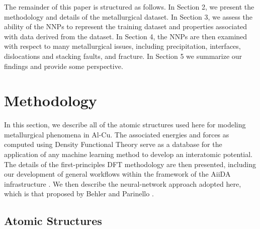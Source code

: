 \documentclass{article}
\begin{document}
The remainder of this paper is structured as follows.  In Section 2, we present the methodology and details of the metallurgical dataset.  In Section 3, we assess the ability of the NNPs to represent the training dataset and properties associated with data derived from the dataset.  In Section 4, the NNPs are then examined with respect to many metallurgical issues, including precipitation, interfaces, dislocations and stacking faults, and fracture. In Section 5 we summarize our findings and provide some perspective.

\section{Methodology}

In  this section, we describe all of the atomic structures used here for modeling metallurgical phenomena in Al-Cu.  The associated energies and forces as computed using Density Functional Theory serve as a database for the application of any machine learning method to develop an interatomic potential.  The details of the first-principles DFT methodology are then presented, including our development of general workflows within the framework of the AiiDA infrastructure \cite{Huber2020AiiDAProvenance}. 
We then describe the neural-network approach adopted here, which is that proposed by Behler and Parinello \cite{Behler2007GeneralizedSurfaces}.

\subsection{Atomic Structures} \label{sct:atomic_structures}
\end{document}
